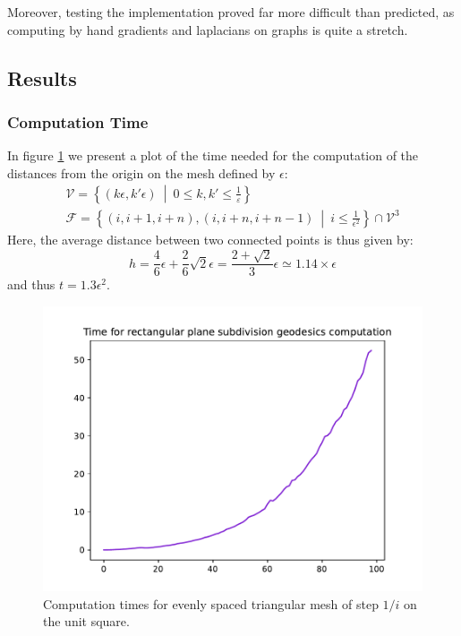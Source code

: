 \documentclass[math, info, english]{cours}
\def\mF{\mathcal{F}}
\def\mV{\mathcal{V}}
\begin{document}
Moreover, testing the implementation proved far more difficult than predicted, as computing by hand gradients and laplacians on graphs is quite a stretch.

\subsection{Results}
\subsubsection{Computation Time}
In figure \ref{computationtime} we present a plot of the time needed for the computation of the distances from the origin on the mesh defined by $\epsilon$:
\begin{align*}
	\mV = \left\{ \left( k\epsilon, k'\epsilon \right) \ \middle| \ 0 \leq k, k' \leq \frac{1}{\varepsilon} \right\}\\
	\mF = \left\{ \left( i, i + 1, i + n \right), \left( i, i + n, i + n -1 \right) \ \middle| \ i \leq \frac{1}{\epsilon^{2}} \right\} \cap \mV^{3}
\end{align*}
Here, the average distance between two connected points is thus given by:
\begin{equation*}
	h = \frac{4}{6}\epsilon + \frac{2}{6}\sqrt{2}\epsilon = \frac{2 + \sqrt{2}}{3}\epsilon \simeq 1.14 \times \epsilon
\end{equation*}
and thus $t = 1.3\epsilon^{2}$.

\begin{figure}[h]
	\centering
	\includegraphics{Figures/tim_comp_planes_i<=100}
	\caption{Computation times for evenly spaced triangular mesh of step $1/i$ on the unit square.}
	\label{computationtime}
\end{figure}
\end{document}
